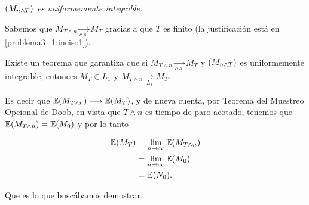 \emph{
    $\left( M_{n\wedge T}\right) $ es uniformemente integrable. 
}

Sabemos que $M_{T \wedge n} \underset{c.s.}\longrightarrow M_T$ gracias a que $T$ es finito 
(la justificación está en \ref{problema3_1:inciso1}).\pn

Existe un teorema que garantiza que si $M_{T \wedge n} \underset{c.s.}\longrightarrow M_T$ y 
$\left( M_{n\wedge T}\right) $ es uniformemente integrable, entonces 
$M_T \in L_1$ y $M_{T \wedge n} \underset{L_1}\longrightarrow M_T$.\pn

Es decir que $\mathbb{E}(M_{T \wedge n}) \longrightarrow \mathbb{E}(M_T)$, y de nueva cuenta, por Teorema del Muestreo Opcional de Doob, 
en vista que $T \wedge n$ es tiempo de paro acotado, tenemos que $\mathbb{E}(M_{T \wedge n}) = \mathbb{E}(M_0)$ y por lo tanto

\begin{align}
    \mathbb{E}(M_T)     &=  \lim_{n \rightarrow \infty} \mathbb{E}(M_{T \wedge n})      \\
                &=  \lim_{n \rightarrow \infty} \mathbb{E}(M_0)                 \\
                &=  \mathbb{E}(N_0).
\end{align}\pn

Que es lo que buscábamos demostrar.

